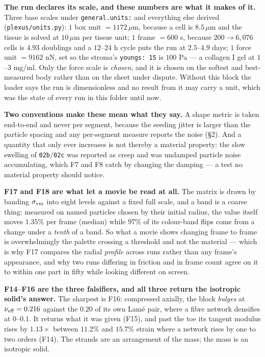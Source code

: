 \documentclass[10pt,a4paper]{article}
\newcommand{\code}[1]{\texttt{#1}}
\newcommand{\op}[1]{\texttt{#1}}
\begin{document}
\textbf{The run declares its scale, and these numbers are what it makes of it.} Three base scales
under \code{general.units:} and everything else derived (\code{plexus/units.py}): $1$ box unit
$=1172\,\mu$m, because a cell is $8.5\,\mu$m and the tissue is solved at $10\,\mu$m per tissue
unit; $1$ frame $=600$ s, because $200\to6{,}076$ cells is $4.93$ doublings and a $12$--$24$ h
cycle puts the run at $2.5$--$4.9$ days; $1$ force unit $=9162$ nN, set so the stroma's
\code{youngs: 15} is $100$ Pa --- a collagen I gel at $1$--$3$ mg/ml. Only the force scale is
\emph{chosen}, and it is chosen on the softest and best-measured body rather than on the sheet under
dispute. Without this block the loader says the run is dimensionless and no result from it may carry
a unit, which was the state of every run in this folder until now.

\textbf{Two conventions make these mean what they say.} A shape metric is taken end-to-end and never
per segment, because the seeding jitter is larger than the particle spacing and any per-segment
measure reports the noise (\S2). And a quantity that only ever increases is not thereby a material
property: the slow swelling of \op{02b}/\op{02c} was reported as creep and was undamped particle
noise accumulating, which F7 and F8 catch by changing the damping --- a test no material property
should notice.

\textbf{F17 and F18 are what let a movie be read at all.} The matrix is drawn by banding
$\sigma_{\rm vm}$ into eight levels against a fixed full scale, and a band is a coarse thing: measured
on named particles chosen by their initial radius, the value itself moves $1.35\%$ per frame (median)
while $97\%$ of its colour-band flips come from a change under a \emph{tenth} of a band. So what a
movie shows changing frame to frame is overwhelmingly the palette crossing a threshold and not the
material --- which is why F17 compares the radial \emph{profile} across runs rather than any frame's
appearance, and why two runs differing in friction and in frame count agree on it to within one part
in fifty while looking different on screen.

\textbf{F14--F16 are the three falsifiers, and all three return the isotropic solid's answer.}
The sharpest is F16: compressed axially, the block \emph{bulges} at $\nu_{\rm eff}=0.216$ against the
$0.20$ of its own Lam\'e pair, where a fibre network densifies at $0$--$0.1$. It returns what it was
given (F15), and past the toe its tangent modulus rises by $1.13\times$ between $11.2\%$ and $15.7\%$
strain where a network rises by one to two orders (F14). The strands are an arrangement of the mass;
the mass is an isotropic solid.
\end{document}
